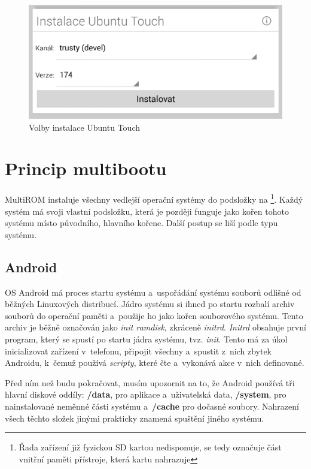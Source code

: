 \documentclass[12pt, a4paper, oneside]{article}
\newcommand{\B}{\textbf} %
\newcommand{\It}{\textit}  %
\begin{document}
\begin{figure}[H]
\begin{center}
 \includegraphics[width=\textwidth]{img/mgr_ubuntu.png}
\caption{Volby instalace Ubuntu Touch}
\end{center}
\end{figure}


\section {Princip multibootu}
\label{princip-multibootu}
MultiROM instaluje všechny vedlejší operační systémy do podsložky na \footnote{Řada zařízení již fyzickou SD kartou nedisponuje,  se tedy označuje část vnitřní paměti přístroje, která kartu nahrazuje}. Každý systém má svoji vlastní podsložku, která je později funguje jako kořen tohoto systému místo původního, hlavního kořene. Další postup se liší podle typu systému.

\subsection{Android}
OS Android má proces startu systému a~uspořádání systému souborů odlišné od běžných Linuxových distribucí. Jádro systému si ihned po startu rozbalí archiv souborů do operační paměti a~použije ho jako kořen souborového systému. Tento archiv je běžně označován jako \It{init ramdisk}, zkráceně \It{initrd}. \It{Initrd} obsahuje první program, který se spustí po startu jádra systému, tvz. \It{init}. Tento má za úkol inicializovat zařízení v~telefonu, připojit všechny  a~spustit z~nich zbytek Androidu, k~čemuž používá \It{scripty}, které čte a~vykonává akce v~nich definované.

Před ním než budu pokračovat, musím upozornit na to, že Android používá tři hlavní diskové oddíly: \B{/data}, pro aplikace a~uživatelská data, \B{/system}, pro nainstalované neměnné části systému a~\B{/cache} pro dočasné soubory. Nahrazení všech těchto složek jinými prakticky znamená spuštění jiného systému.
\end{document}
